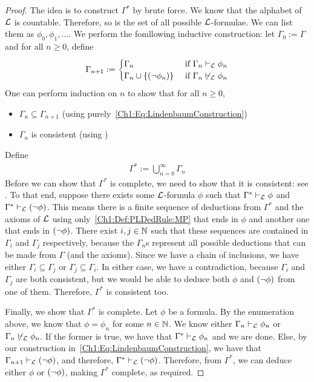 \begin{proof}
    The idea is to construct $\Gamma^*$ by brute force. We know that the alphabet of $\mathcal{L}$ is countable. Therefore, so is the set of all possible $\mathcal{L}$-formulae. We can list them as $\phi_0, \phi_1, \ldots$. We perform the fomllowing inductive construction: let $\Gamma_0 := \Gamma$ and for all $n \geq 0$, define
    \begin{align}
        \Gamma_{n + 1} :=
        \begin{cases}
            \Gamma_n & \text{ if } \Gamma_n \vdash_{\mathcal{L}} \phi_n \\
            \Gamma_{n} \cup \left\{ \left( \neg \phi_n \right) \right\} & \text{ if } \Gamma_n \not\vdash_{\mathcal{L}} \phi_n
        \end{cases}
        \label{Ch1:Eq:LindenbaumConstruction}
    \end{align}
    One can perform induction on $n$ to show that for all $n \geq 0$,
    \begin{itemize}[noitemsep]
        \item $\Gamma_n \subseteq \Gamma_{n + 1}$ (using purely~\eqref{Ch1:Eq:LindenbaumConstruction})
        \item $\Gamma_n$ is consistent (using )
    \end{itemize}
    Define
    \begin{align*}
        \Gamma^* := \bigcup_{n = 0}^{\infty} \Gamma_n
    \end{align*}
    Before we can show that $\Gamma^*$ is complete, we need to show that it is consistent: see . To that end, suppose there exists some $\mathcal{L}$-formula $\phi$ such that $\Gamma^* \vdash_{\mathcal{L}} \phi$ and $\Gamma^* \vdash_{\mathcal{L}} \left( \neg \phi \right)$. This means there is a finite sequence of deductions from $\Gamma^*$ and the axioms of $\mathcal{L}$ using only~\ref{Ch1:Def:PLDedRule:MP} that ends in $\phi$ and another one that ends in $\left( \neg \phi \right)$. There exist $i, j \in \mathbb{N}$ such that these sequences are contained in $\Gamma_i$ and $\Gamma_j$ respectively, because the $\Gamma_n$s represent all possible deductions that can be made from $\Gamma$ (and the axioms). Since we have a chain of inclusions, we have either $\Gamma_i \subseteq \Gamma_j$ or $\Gamma_j \subseteq \Gamma_i$. In either case, we have a contradiction, because $\Gamma_i$ and $\Gamma_j$ are both consistent, but we would be able to deduce both $\phi$ and $\left( \neg \phi \right)$ from one of them. Therefore, $\Gamma^*$ is consistent too.

    Finally, we show that $\Gamma^*$ is complete. Let $\phi$ be a formula. By the enumeration above, we know that $\phi = \phi_n$ for some $n \in \mathbb{N}$. We know either $\Gamma_n \vdash_{\mathcal{L}} \phi_n$ or $\Gamma_n \not\vdash_{\mathcal{L}} \phi_n$. If the former is true, we have that $\Gamma^* \vdash_{\mathcal{L}} \phi_n$ and we are done. Else, by our construction in~\eqref{Ch1:Eq:LindenbaumConstruction}, we have that $\Gamma_{n+1} \vdash_{\mathcal{L}} \left( \neg \phi \right)$, and therefore, $\Gamma^* \vdash_{\mathcal{L}} \left( \neg \phi \right)$. Therefore, from $\Gamma^*$, we can deduce either $\phi$ or $\left( \neg \phi \right)$, making $\Gamma^*$ complete, as required.
\end{proof}

